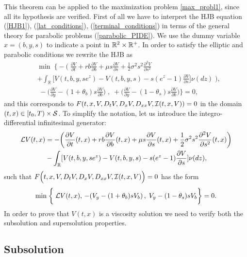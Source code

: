 This theorem can be applied to the maximization problem \ref{max_probl1}, since all its hypothesis are verified.
\newline
\noindent
First of all we have to interpret the HJB equation (\ref{HJB1}), (\ref{lat_conditions}), (\ref{terminal_conditions}) in terms of the general theory for parabolic problems 
(\ref{parabolic_PIDE}). 
We use the dummy variable $x = (b,y,s)$ to indicate a point in $\mathbb{R}^2\times \mathbb{R}^+$. In order to satisfy the elliptic and parabolic conditions we rewrite the  HJB as 
\begin{align}\label{HJB2}
& \min \; \biggl\{ - \biggl( \; \frac{\partial V}{\partial t} + rb\frac{\partial V}{\partial b} 
+ \mu s \frac{\partial V}{\partial s} + \frac{1}{2}\sigma^2 s^2 \frac{\partial^2 V}{\partial s^2} \\ \nonumber
&+ \int_\mathbb{R}
\biggl[ V(t,b,y,se^z) - V(t,b,y,s) - s(e^z-1)\frac{\partial V}{\partial s} \biggr] \nu(dz) \; \biggr) ,\\ \nonumber
& \; - \biggl( \frac{\partial V}{\partial y}-(1+\theta_b) s \frac{\partial V}{\partial b} \biggr) \; 
, \; + \biggl(\frac{\partial V}{\partial y}-(1-\theta_s)s \frac{\partial V}{\partial b} \biggr) \biggr\} = 0, 
\end{align}
and this corresponds to   
$ F(t,x,V,D_t V,D_x V,D_{xx}V,\mathcal{I}(t,x,V)) = 0$ in the domain $(t,x) \in [t_0,T) \times \mathcal{S}$.
To simplify the notation, let us introduce the integro-differential infinitesimal generator:
\begin{align*}
 \mathcal{L} V(t,x) &= -\biggl( \frac{\partial V}{\partial t}(t,x) + rb\frac{\partial V}{\partial b}(t,x) 
  + \mu s \frac{\partial V}{\partial s}(t,x) + \frac{1}{2}\sigma^2 s^2 \frac{\partial^2V}{\partial s^2}(t,x)\biggr) \\
  &- \int_{\mathbb{R}}
[ V(t,b,y,se^z) - V(t,b,y,s) - s(e^z-1)\frac{\partial V}{\partial s} ] \nu(dz),
\end{align*}
such that $F\Bigl(t,x,V,D_t V,D_x V,D_{xx}V,\mathcal{I}(t,x,V)\Bigr) = 0$ has the form
\begin{equation}\label{qvi_min}
  \min \; \biggl\{ \; \mathcal{L} V(t,x),
  \, -(V_y-(1+\theta_b)sV_b) \, , \; V_y-(1-\theta_s)s V_b \biggr\} = 0.
\end{equation}
In order to prove that $V(t,x)$ is a viscosity solution we need to verify both the subsolution and supersolution properties.



\subsection{Subsolution}

